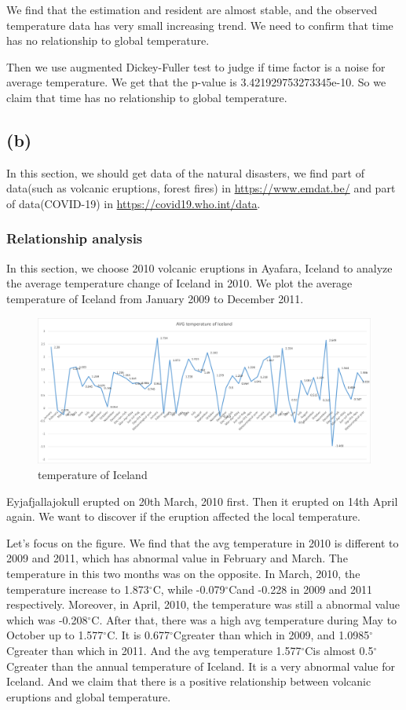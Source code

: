 \documentclass{apmcmthesis}
\def\oc{$^{\circ}$C\;}
\begin{document}
We find that the estimation and resident are almost stable, and the observed temperature data has very small increasing trend. 
We need to confirm that time has no relationship to global temperature.

Then we use augmented Dickey-Fuller test to judge if time factor is a noise for average temperature.
We get that the p-value is 3.421929753273345e-10.
So we claim that time has no relationship to global temperature.


\subsection{(b)}
In this section, we should get data of the natural disasters, we find part of data(such as volcanic eruptions, forest fires) in \url{https://www.emdat.be/} and part of data(COVID-19) in \url{https://covid19.who.int/data}.

\subsubsection{Relationship analysis}
In this section, we choose 2010 volcanic eruptions in Ayafara, Iceland to analyze the average temperature change of Iceland in 2010.
We plot the average temperature of Iceland from January 2009 to December 2011.

\begin{figure}[htbp]
  \centering
  \includegraphics[scale=0.45]{Iceland.png}
  \caption{temperature of Iceland}
\end{figure}

Eyjafjallajokull erupted on 20th March, 2010 first.
Then it erupted on 14th April again.
We want to discover if the eruption affected the local temperature. 

Let's focus on the figure.
We find that the avg temperature in 2010 is different to 2009 and 2011, which has abnormal value in February and March.
The temperature in this two months was on the opposite. 
In March, 2010, the temperature increase to 1.873\oc, while -0.079\oc and -0.228 in 2009 and 2011 respectively.
Moreover, in April, 2010, the temperature was still a abnormal value which was -0.208\oc.
After that, there was a high avg temperature during May to October up to 1.577\oc.
It is 0.677\oc greater than which in 2009, and 1.0985\oc greater than which in 2011.
And the avg temperature 1.577\oc is almost 0.5\oc greater than the annual temperature of Iceland.
It is a very abnormal value for Iceland.
And we claim that there is a positive relationship between volcanic eruptions and global temperature. 
\end{document}
